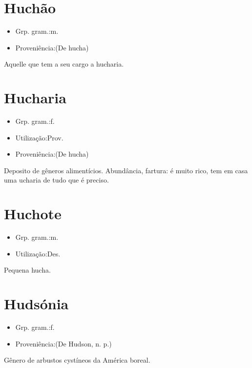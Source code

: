 \documentclass{article}
\begin{document}
\section{Huchão}
\begin{itemize}
\item {Grp. gram.:m.}
\end{itemize}
\begin{itemize}
\item {Proveniência:(De \textunderscore hucha\textunderscore )}
\end{itemize}
Aquelle que tem a seu cargo a hucharia.
\section{Hucharia}
\begin{itemize}
\item {Grp. gram.:f.}
\end{itemize}
\begin{itemize}
\item {Utilização:Prov.}
\end{itemize}
\begin{itemize}
\item {Proveniência:(De \textunderscore hucha\textunderscore )}
\end{itemize}
Deposito de gêneros alimentícios.
Abundância, fartura: \textunderscore é muito rico, tem em casa uma ucharia de tudo que é preciso\textunderscore .
\section{Huchote}
\begin{itemize}
\item {Grp. gram.:m.}
\end{itemize}
\begin{itemize}
\item {Utilização:Des.}
\end{itemize}
Pequena hucha.
\section{Hudsónia}
\begin{itemize}
\item {Grp. gram.:f.}
\end{itemize}
\begin{itemize}
\item {Proveniência:(De \textunderscore Hudson\textunderscore , n. p.)}
\end{itemize}
Gênero de arbustos cystíneos da América boreal.
\end{document}
